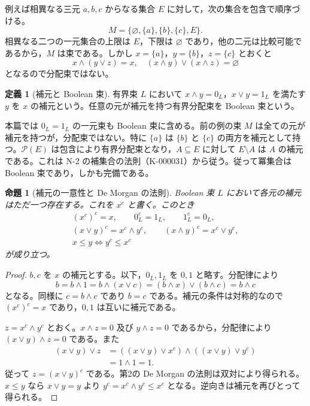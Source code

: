 \documentclass[a5paper,10pt,dvipdfmx]{jsarticle}
\theoremstyle{definition}
\newtheorem{defn}[ruledef]{定義}
\theoremstyle{plain}
\newtheorem{prop}[ruledef]{命題}
\newcommand{\iffc}{\Longleftrightarrow}
\newcommand{\Pow}{\mathcal{P}}
\begin{document}
例えば相異なる三元 $a,b,c$ からなる集合 $E$ に対して，次の集合を包含で順序づける。
\[
 M=\{\varnothing,\{a\},\{b\},\{c\},E\}.
\]
相異なる二つの一元集合の上限は $E$，下限は $\varnothing$ であり，他の二元は比較可能であるから，$M$ は束である。しかし $x=\{a\}$，$y=\{b\}$，$z=\{c\}$ とおくと
\[
 x\wedge(y\vee z)=x,\quad (x\wedge y)\vee(x\wedge z)=\varnothing
\]
となるので分配束ではない。
\begin{defn}[補元と Boolean 束]\label{k89}
有界束 $L$ において $x\wedge y=0_L$，$x\vee y=1_L$ を満たす $y$ を $x$ の補元という。任意の元が補元を持つ有界分配束を Boolean 束という。
\end{defn}
本篇では $0_L=1_L$ の一元束も Boolean 束に含める。前の例の束 $M$ は全ての元が補元を持つが，分配束ではない。特に $\{a\}$ は $\{b\}$ と $\{c\}$ の両方を補元として持つ。$\Pow(E)$ は包含により有界分配束となり，$A\subseteq E$ に対して $E\setminus A$ は $A$ の補元である。これは N-2 の補集合の法則（K-000031）から従う。従って冪集合は Boolean 束であり，しかも完備である。
\begin{prop}[補元の一意性と De Morgan の法則]\label{k90}
Boolean 束 $L$ において各元の補元はただ一つ存在する。これを $x^c$ と書く。このとき
\begin{gather*}
 (x^c)^c=x,\qquad 0_L^c=1_L,\qquad 1_L^c=0_L,\\
 (x\vee y)^c=x^c\wedge y^c,\qquad
 (x\wedge y)^c=x^c\vee y^c,\\
 x\leq y\iffc y^c\leq x^c
\end{gather*}
が成り立つ。
\end{prop}
\begin{proof}
$b,c$ を $x$ の補元とする。以下，$0_L,1_L$ を $0,1$ と略す。分配律により
\[
 b=b\wedge1=b\wedge(x\vee c)=(b\wedge x)\vee(b\wedge c)=b\wedge c
\]
となる。同様に $c=b\wedge c$ であり $b=c$ である。補元の条件は対称的なので $(x^c)^c=x$ であり，$0,1$ は互いに補元である。

$z=x^c\wedge y^c$ とおく。$x\wedge z=0$ 及び $y\wedge z=0$ であるから，分配律により $(x\vee y)\wedge z=0$ である。また
\begin{align*}
 (x\vee y)\vee z
 &=((x\vee y)\vee x^c)\wedge((x\vee y)\vee y^c)\\
 &=1\wedge1=1.
\end{align*}
従って $z=(x\vee y)^c$ である。第2の De Morgan の法則は双対により得られる。$x\leq y$ なら $x\vee y=y$ より $y^c=x^c\wedge y^c\leq x^c$ となる。逆向きは補元を再びとって得られる。
\end{proof}
\end{document}
